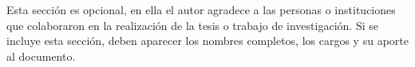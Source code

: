 Esta secci\'{o}n es opcional, en ella el autor agradece a las personas o instituciones que colaboraron en la realizaci\'{o}n de la tesis  o trabajo de investigaci\'{o}n. Si se incluye esta secci\'{o}n, deben aparecer los nombres completos, los cargos y su aporte al documento.\\
